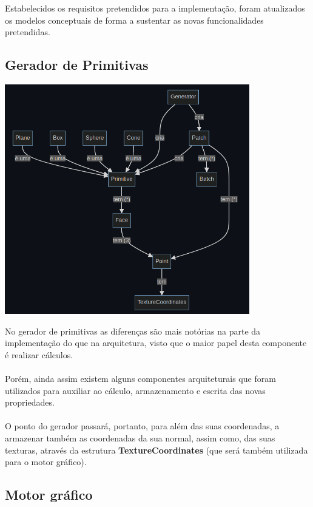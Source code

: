 Estabelecidos os requisitos pretendidos para a
implementação, foram atualizados os modelos conceptuais
de forma a sustentar as novas funcionalidades pretendidas.
\newline

\subsection{Gerador de Primitivas}

\begin{center}
    \includegraphics[width=0.8\textwidth]{imgs/concept1.png}
    \label{fig:domger}
\end{center}

\noindent
No gerador de primitivas as diferenças são mais notórias na parte
da implementação do que na arquitetura, visto que o maior papel
desta componente é realizar cálculos.\\
\\
Porém, ainda assim existem alguns componentes arquiteturais
que foram utilizados para auxiliar ao cálculo, armazenamento
e escrita das novas propriedades.\\
\\
O ponto do gerador passará, portanto, para além das suas coordenadas,
a armazenar também as coordenadas da sua normal, assim como, das
suas texturas, através da estrutura \textbf{TextureCoordinates}
(que será também utilizada para o motor gráfico).

\subsection{Motor gráfico}

